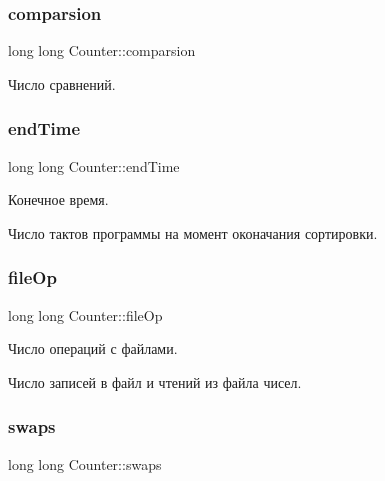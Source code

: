 \subsubsection{\texorpdfstring{comparsion}{comparsion}}
{\footnotesize\ttfamily long long Counter\+::comparsion\hspace{0.3cm}{\ttfamily [private]}}



Число сравнений. 

\hypertarget{class_counter_a961ca391c9a8e3ac0efb8d6d61d734d4}{}\label{class_counter_a961ca391c9a8e3ac0efb8d6d61d734d4} 
\subsubsection{\texorpdfstring{end\+Time}{endTime}}
{\footnotesize\ttfamily long long Counter\+::end\+Time\hspace{0.3cm}{\ttfamily [private]}}



Конечное время. 

Число тактов программы на момент оконачания сортировки. \hypertarget{class_counter_abc197117fc99ab93bebc483059ae0fbc}{}\label{class_counter_abc197117fc99ab93bebc483059ae0fbc} 
\subsubsection{\texorpdfstring{file\+Op}{fileOp}}
{\footnotesize\ttfamily long long Counter\+::file\+Op\hspace{0.3cm}{\ttfamily [private]}}



Число операций с файлами. 

Число записей в файл и чтений из файла чисел. \hypertarget{class_counter_a2a5ee961a25c6eb87d1ad02bcef4ade1}{}\label{class_counter_a2a5ee961a25c6eb87d1ad02bcef4ade1} 
\subsubsection{\texorpdfstring{swaps}{swaps}}
{\footnotesize\ttfamily long long Counter\+::swaps\hspace{0.3cm}{\ttfamily [private]}}



